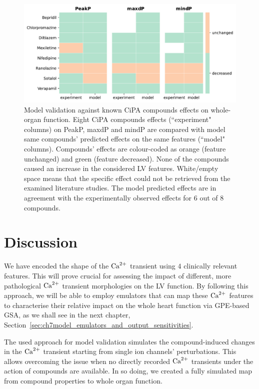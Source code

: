 \begin{figure}[ht!]
    \myfloatalign
    \includegraphics[width=\textwidth]{figures/chapter06/model_vs_experiments.pdf}
    \caption{Model validation against known CiPA compounds effects on whole-organ function. Eight CiPA compounds effects (``experiment" columns) on PeakP, maxdP and mindP are compared with model same compounds' predicted effects on the same features (``model" columns). Compounds' effects are colour-coded as orange (feature unchanged) and green (feature decreased). None of the compounds caused an increase in the considered LV features. White/empty space means that the specific effect could not be retrieved from the examined literature studies. The model predicted effects are in agreement with the experimentally observed effects for $6$ out of $8$ compounds.}
    \label{fig:validationtable}
\end{figure}


%
%
%
\section{Discussion}\label{sec:ch6discussion}
We have encoded the shape of the $\textrm{Ca}^{2+}$ transient using $4$ clinically relevant features. This will prove crucial for assessing the impact of different, more pathological $\textrm{Ca}^{2+}$ transient morphologies on the LV function. By following this approach, we will be able to employ emulators that can map these $\textrm{Ca}^{2+}$ features to characterise their relative impact on the whole heart function via GPE-based GSA, as we shall see in the next chapter, Section~\ref{sec:ch7model_emulators_and_output_sensitivities}.

\vspace{0.2cm}
The used approach for model validation simulates the compound-induced changes in the $\textrm{Ca}^{2+}$ transient starting from single ion channels' perturbations. This allows overcoming the issue when no directly recorded $\textrm{Ca}^{2+}$ transients under the action of compounds are available. In so doing, we created a fully simulated map from compound properties to whole organ function.


